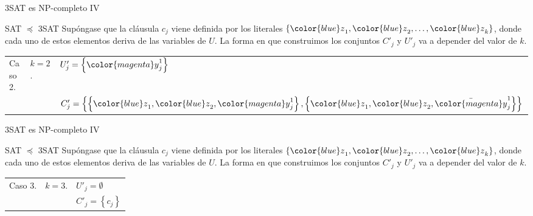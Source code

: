 \documentclass[10pt, mathserif, profesionalfont]{beamer}
\begin{document}
\begin{frame}{3SAT es NP-completo IV}
    
\begin{block}{SAT $\preceq$ 3SAT}    
Supóngase que la cláusula $c_j$ viene definida por los literales $\left \{ {\color{blue}z}_1, {\color{blue}z}_2, \dots, {\color{blue}z}_k  \right\}$, donde cada uno de estos elementos deriva de las variables de $U$. La forma en que construimos los conjuntos  $C'_j$ y $U'_j$ va a depender del valor de $k$.

\vspace{0.5cm}
{\small 
\renewcommand{\arraystretch}{1.8}
\begin{tabular}{@{}L{.10\textwidth}L{.10\textwidth}L{.70\textwidth}@{}} 
Caso 2. & $k = 2$. & $U'_j = \left \{ {\color{magenta}y}_j^1 \right \}$ \\
        &          &$C'_j = \left \{ \left \{  {\color{blue}z}_1, {\color{blue}z}_2, {\color{magenta}y}_j^1  \right \}, \left \{  {\color{blue}z}_1, {\color{blue}z}_2, \bar{{\color{magenta}y}}_j^1  \right \}   \right \}$ 	\\
\end{tabular}
}
\end{block}

\end{frame}


\begin{frame}{3SAT es NP-completo IV}
    
\begin{block}{SAT $\preceq$ 3SAT}    
Supóngase que la cláusula $c_j$ viene definida por los literales $\left \{ {\color{blue}z}_1, {\color{blue}z}_2, \dots, {\color{blue}z}_k  \right\}$, donde cada uno de estos elementos deriva de las variables de $U$. La forma en que construimos los conjuntos  $C'_j$ y $U'_j$ va a depender del valor de $k$.

\vspace{0.5cm}
{\small 
\renewcommand{\arraystretch}{1.8}
\begin{tabular}{@{}L{.10\textwidth}L{.10\textwidth}L{.70\textwidth}@{}} 
Caso 3. & $k = 3$. & $U'_j = \emptyset$ \\
        &          &$C'_j = \left \{  c_j  \right \}$ 	\\        
\end{tabular}
}
\end{block}

\end{frame}
\end{document}
